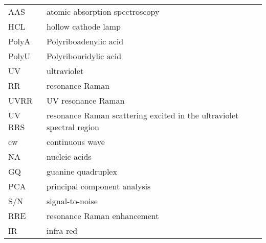 

\noindent
\begin{tabularx}{\textwidth}{@{}l@{\,\dotfill\dots\,}X@{}}
AAS
	& atomic absorption spectroscopy\\
HCL
	& hollow cathode lamp\\
PolyA
	& Polyriboadenylic acid\\
PolyU
	& Polyribouridylic acid\\
UV
	& ultraviolet\\
RR
	& resonance Raman\\
UVRR
	& UV resonance Raman\\
UV RRS
	& resonance Raman scattering excited in the ultraviolet spectral region\\
cw
	& continuous wave\\
NA
	& nucleic acids\\
GQ
	& guanine quadruplex\\
PCA
	& principal component analysis\\
S/N
	& signal-to-noise\\
RRE
	& resonance Raman enhancement\\
IR
	& infra red
\end{tabularx}
